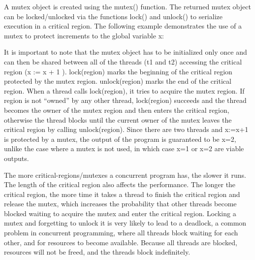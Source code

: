 A mutex object is created using the \textsf{mutex()}
function. The returned mutex object can be locked/unlocked via the
functions \textsf{lock()} and \textsf{unlock()}
to serialize execution in a critical region. The following example
demonstrates the use of a mutex to protect increments to the global
variable \textsf{x}:


It is important to note that the mutex object has to be initialized only
once and can then be shared between all of the threads
(\textsf{t1} and \textsf{t2}) accessing
the critical region (\textsf{x := x + 1} ).
\textsf{lock(region)} marks the beginning of the
critical region protected by the mutex region.
\textsf{unlock(region)} marks the end of the critical
region. When a thread calls \textsf{lock(region)}, it
tries to acquire the mutex \textsf{region}. If
\textsf{region} is not
{\textquotedblleft}owned{\textquotedblright} by any other thread,
\textsf{lock(region)} succeeds and the thread becomes
the owner of the mutex \textsf{region} and then enters
the critical region, otherwise the thread blocks until the current
owner of the mutex leaves the critical region by calling
\textsf{unlock(region)}. Since there are two threads
and \textsf{x:=x+1} is protected by a mutex, the output of
the program is guaranteed to be \textsf{x=2}, unlike the
case where a mutex is not used, in which case \textsf{x=1}
or \textsf{x=2} are viable outputs.

The more critical-regions/mutexes a concurrent program has, the slower
it runs. The length of the critical region also affects the
performance. The longer the critical region, the more time it takes a
thread to finish the critical region and release the mutex, which
increases the probability that other threads become blocked waiting to
acquire the mutex and enter the critical region. Locking a mutex and
forgetting to unlock it is very likely to lead to a deadlock, a common
problem in concurrent programming, where all threads block waiting for
each other, and for resources to become available. Because all threads
are blocked, resources will not be freed, and the threads block
indefinitely. 

